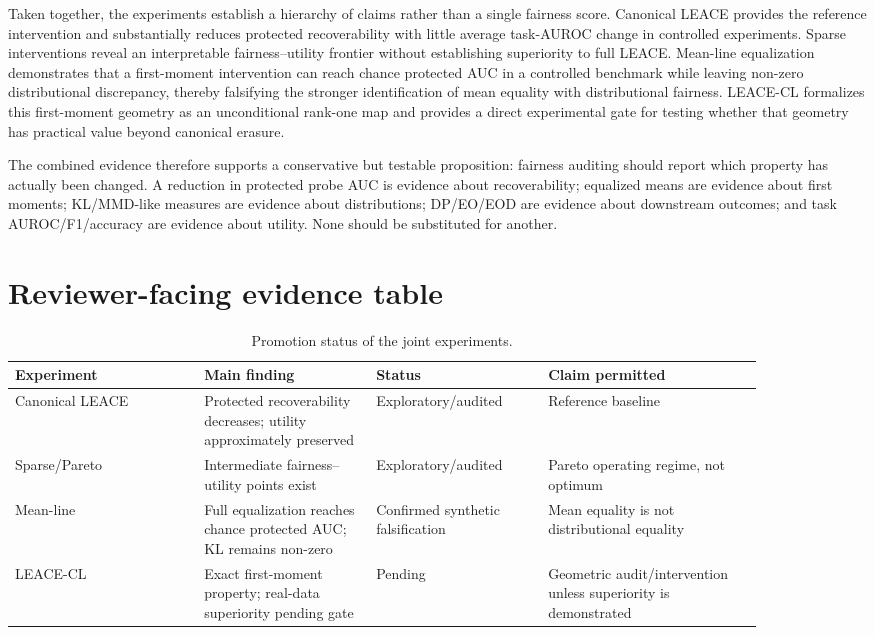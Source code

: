 Taken together, the experiments establish a hierarchy of claims rather than a single fairness score. Canonical LEACE provides the reference intervention and substantially reduces protected recoverability with little average task-AUROC change in controlled experiments. Sparse interventions reveal an interpretable fairness--utility frontier without establishing superiority to full LEACE. Mean-line equalization demonstrates that a first-moment intervention can reach chance protected AUC in a controlled benchmark while leaving non-zero distributional discrepancy, thereby falsifying the stronger identification of mean equality with distributional fairness. LEACE-CL formalizes this first-moment geometry as an unconditional rank-one map and provides a direct experimental gate for testing whether that geometry has practical value beyond canonical erasure.

The combined evidence therefore supports a conservative but testable proposition: fairness auditing should report which property has actually been changed. A reduction in protected probe AUC is evidence about recoverability; equalized means are evidence about first moments; KL/MMD-like measures are evidence about distributions; DP/EO/EOD are evidence about downstream outcomes; and task AUROC/F1/accuracy are evidence about utility. None should be substituted for another.

\section{Reviewer-facing evidence table}
\begin{table}[t]
\caption{Promotion status of the joint experiments.}
\label{tab:promotion}
\begin{tabular}{p{0.22\linewidth}p{0.20\linewidth}p{0.20\linewidth}p{0.25\linewidth}}
\toprule
Experiment & Main finding & Status & Claim permitted\\
\midrule
Canonical LEACE & Protected recoverability decreases; utility approximately preserved & Exploratory/audited & Reference baseline\\
Sparse/Pareto & Intermediate fairness--utility points exist & Exploratory/audited & Pareto operating regime, not optimum\\
Mean-line & Full equalization reaches chance protected AUC; KL remains non-zero & Confirmed synthetic falsification & Mean equality is not distributional equality\\
LEACE-CL & Exact first-moment property; real-data superiority pending gate & Pending & Geometric audit/intervention unless superiority is demonstrated\\
\bottomrule
\end{tabular}
\end{table}
